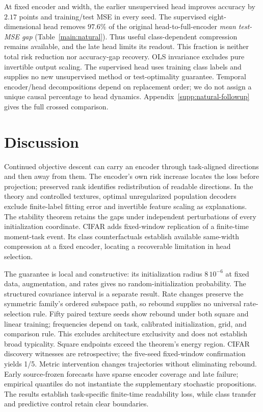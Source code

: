 At fixed encoder and width, the earlier unsupervised head improves accuracy by $2.17$ points and training/test MSE in every seed. The supervised eight-dimensional head removes $97.6\%$ of the original head-to-full-encoder \emph{mean test-MSE gap} (Table~\ref{main:natural}). Thus useful class-dependent compression remains available, and the late head limits its readout. This fraction is neither total risk reduction nor accuracy-gap recovery. OLS invariance excludes pure invertible output scaling. The supervised head uses training class labels and supplies no new unsupervised method or test-optimality guarantee. Temporal encoder/head decompositions depend on replacement order; we do not assign a unique causal percentage to head dynamics. Appendix~\ref{supp:natural-followup} gives the full crossed comparison.

\section{Discussion}
Continued objective descent can carry an encoder through task-aligned directions and then away from them. The encoder's own risk increase locates the loss before projection; preserved rank identifies redistribution of readable directions. In the theory and controlled textures, optimal unregularized population decoders exclude finite-label fitting error and invertible feature scaling as explanations. The stability theorem retains the gaps under independent perturbations of every initialization coordinate. CIFAR adds fixed-window replication of a finite-time moment-task event. Its class counterfactuals establish available same-width compression at a fixed encoder, locating a recoverable limitation in head selection.

The guarantee is local and constructive: its initialization radius $8\,10^{-6}$ at fixed data, augmentation, and rates gives no random-initialization probability. The structured covariance interval is a separate result. Rate changes preserve the symmetric family's ordered subspace path, so rebound supplies no universal rate-selection rule. Fifty paired texture seeds show rebound under both square and linear training; frequencies depend on task, calibrated initialization, grid, and comparison rule. This excludes architecture exclusivity and does not establish broad typicality. Square endpoints exceed the theorem's energy region. CIFAR discovery witnesses are retrospective; the five-seed fixed-window confirmation yields 1/5. Metric intervention changes trajectories without eliminating rebound. Early source-frozen forecasts have sparse encoder coverage and late failure; empirical quantiles do not instantiate the supplementary stochastic propositions. The results establish task-specific finite-time readability loss, while class transfer and predictive control retain clear boundaries.
